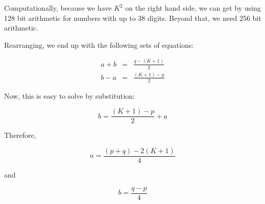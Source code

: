\documentclass[12pt,letterpaper]{article}
\begin{document}
Computationally, because we have $K^2$ on the right hand side, we can get by using 128 bit arithmetic for numbers with up to 38 digits. Beyond that, we need 256 bit arithmetic.

Rearranging, we end up with the following sets of equations:

\begin{eqnarray}
%
a + b & = & \frac{q - (K + 1)}{2} \\
%
b - a & = & \frac{(K + 1) - p}{2}
%
\end{eqnarray}

Now, this is easy to solve by substitution:

\begin{equation}
    b = \frac{(K + 1) - p}{2} + a
\end{equation}

Therefore,

\begin{equation}
    a = \frac{(p + q) - 2(K + 1)}{4}
\end{equation}

and

\begin{equation}
    b = \frac{q - p}{4}
\end{equation}
\end{document}
